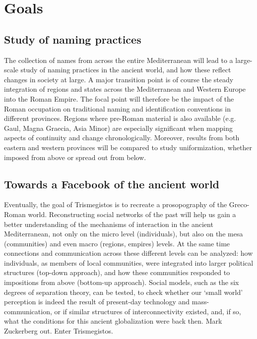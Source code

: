 \documentclass[amsthm,ebook]{saparticle}
\begin{document}
\section{Goals}
\subsection{Study of naming practices}


\noindent The collection of names from across the entire Mediterranean will lead to a large-scale study of naming practices in the
ancient world, and how these reflect changes in society at large. A major transition point is of course the steady
integration of regions and states across the Mediterranean and Western Europe into the Roman Empire. The focal point
will therefore be the impact of the Roman occupation on traditional naming and identification conventions in different
provinces. Regions where pre-Roman material is also available (e.g. Gaul, Magna Graecia, Asia Minor) are especially
significant when mapping aspects of continuity and change chronologically. Moreover, results from both eastern and
western provinces will be compared to study uniformization, whether imposed from above or spread out from below.




\subsection{Towards a Facebook of the ancient world}


\noindent Eventually, the goal of Trismegistos is to recreate a prosopography of the Greco-Roman world. Reconstructing social
networks of the past will help us gain a better understanding of the mechanisms of interaction in the ancient
Mediterranean, not only on the micro level (individuals), but also on the mesa (communities) and even macro (regions,
empires) levels. At the same time connections and communication across these different levels can be analyzed: how
individuals, as members of local communities, were integrated into larger political structures (top-down approach), and
how these communities responded to impositions from above (bottom-up approach). Social models, such as the six degrees
of separation theory, can be tested, to check whether our `small world' perception is indeed the result of present-day
technology and mass-communication, or if similar structures of interconnectivity existed, and, if so, what the
conditions for this ancient globalization were back then. Mark Zuckerberg out. Enter Trismegistos. 




\end{document}
